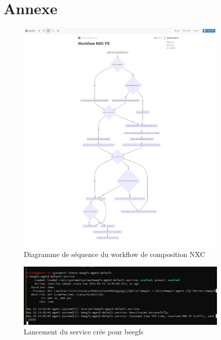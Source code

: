 \documentclass[a4paper,french,12pt, titlepage]{article}
\begin{document}
\newpage

\hypertarget{annexe}{%
\section{Annexe}\label{annexe}}

\printbibliography

\printglossaries

\newpage

\begin{figure}
\centering
\includegraphics[width=0.9\textwidth,height=0.9\textheight,keepaspectratio]{annexe/workflowpre.png}
\caption{Diagramme de séquence du workflow de composition NXC}
\end{figure}

\begin{figure}
\centering
\includegraphics[width=0.9\textwidth,height=0.9\textheight,keepaspectratio]{annexe/beegfs_service.png}
\caption{Lancement du service crée pour beegfs}
\end{figure}
\end{document}
